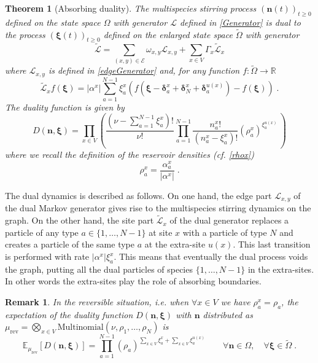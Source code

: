 \documentclass[10pt]{article}
\numberwithin{equation}{section}
\numberwithin{equation}{subsection}
\newtheorem{theorem}{Theorem}
\newtheorem{remark}{Remark}
\newcommand{\dt}{\;.}
\newcommand{\twoj}{\nu}
\begin{document}
\begin{theorem}[Absorbing duality]\label{thm-duality}
	The multispecies stirring process $(\bm{n}(t))_{t\geq 0}$ defined on the state space $\Omega$ with generator $\mathcal{L}$ defined in \eqref{Generator} is dual to the process $(\bm{\xi}(t))_{t\geq 0}$ defined on the enlarged state space $\widetilde{\Omega}$ with generator
	 \begin{equation}\label{DualGenerator}
		\widetilde{\mathcal{L}}=\sum_{(x,y)\in \mathcal{E}}\omega_{x,y}\mathcal{L}_{x,y}+\sum_{x\in V}\Gamma_{x}\widetilde{\mathcal{L}}_{x}
	\end{equation}
where 
$\mathcal{L}_{x,y}$ is defined in \eqref{edgeGenerator} and, for any function $f:\widetilde{\Omega}\to \mathbb{R}$ 
\begin{equation}\label{siteDualGenerator}
	\widetilde{\mathcal{L}}_{x}f(\bm{\xi})=|\alpha^{x}|\sum_{a=1}^{N-1}\xi_{a}^{x}\left(f(\bm{\xi}-\bm{\delta}_{a}^{x}+\bm{\delta}_{N}^{x}+\bm{\delta}_{a}^{u(x)})-f(\bm{\xi})\right)\dt
\end{equation}
The duality function is given by 
\begin{equation}\label{dualityElements}
	D(\bm{n},\bm{\xi})=\prod_{x\in V}\left(\frac{(\nu -\sum_{a=1}^{N-1}\xi_{a}^{x})!}{\nu!}\prod_{a=1}^{N-1}\frac{n_{a}^{x}!}{(n_{a}^{x}-\xi_{a}^{x})!}\left(\rho_{a}^{x}\right)^{\xi_{a}^{u(x)}}\,\right)
\end{equation}
where we recall the definition of the reservoir densities (cf. \eqref{rhox})
\begin{equation}
	\rho_{a}^{x}=\frac{\alpha_{a}^{x}}{|\alpha^{x}|}\dt
\end{equation}
\end{theorem}
The dual dynamics is described as follows. On one hand, the edge part $\mathcal{L}_{x,y}$ of the dual Markov generator gives rise to  the multispecies stirring dynamics on the graph. On the other hand, the site
part $\widetilde{\mathcal{L}}_{x}$ of the dual generator replaces a particle of any type $a\in\{1,\ldots,N-1\}$ at site $x$ with a particle of type $N$ and creates a particle of the same type $a$ at the extra-site $u(x)$. This last transition is performed with rate $|\alpha^{x}|\xi_{a}^{x}$. This means that eventually the dual process voids the graph, putting all the dual particles of species $\{1,\ldots,N-1\}$ in the extra-sites. In other words the extra-sites play the role of absorbing boundaries. 
\begin{remark} In the reversible situation, i.e. when $\forall x\in V$ we have $\rho_{a}^{x}=\rho_{a}$, the expectation  of the duality function  $D(\bm{n},\bm{\xi})$ with   $\bm{n}$ distributed as  $\mu_{\text{rev}} = \bigotimes_{x\in V}\text{Multinomial}\left(\twoj, \rho_{1},\ldots,\rho_{N}\right)$ is
\begin{equation}
\mathbb{E}_{\mu_{\text{rev}}}\left[D(\bm{n},\bm{\xi})\right]=\prod_{a=1}^{N-1}\left(\rho_{a}\right)^{\sum_{x\in V}\xi_{a}^{x}+\sum_{x\in V}\xi_{a}^{u(x)}}\qquad \forall \bm{n}\in \Omega,\quad\forall \bm{\xi}\in \widetilde{\Omega}\dt
\end{equation}
\end{remark}
%
%
\end{document}
